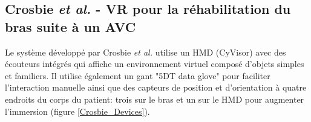		\begin{minipage}{\linewidth}
			\label{Broeren_System}
		\end{minipage}\medskip

	\subsection*{Crosbie \textit{et al.} - VR pour la réhabilitation du bras suite à un AVC}
		Le système développé par Crosbie \textit{et al.} \cite{Crosbie_DevVR4StrokeRehab} utilise un HMD (CyVisor) avec des écouteurs intégrés qui affiche un environnement virtuel composé d'objets simples et familiers. Il utilise également un gant "5DT data glove" pour faciliter l'interaction manuelle ainsi que des capteurs de position et d'orientation à quatre endroits du corps du patient: trois sur le bras et un sur le HMD pour augmenter l'immersion (figure \ref{Crosbie_Devices}).
		
		\begin{minipage}{\linewidth}
			\label{Crosbie_Devices}
		\end{minipage}\medskip
		
